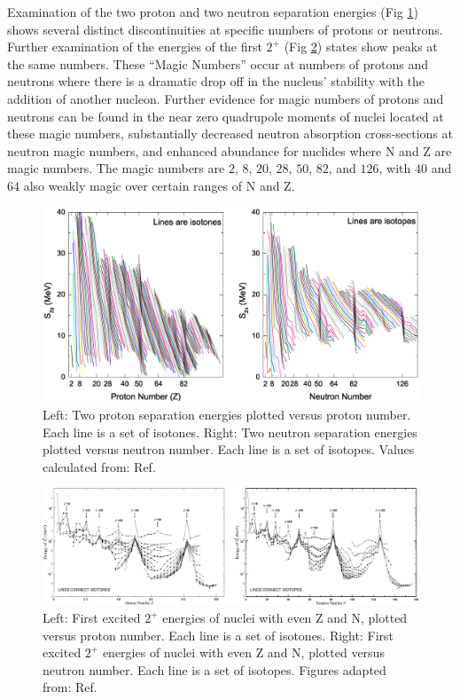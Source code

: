 Examination of the two proton and two neutron separation energies (Fig \ref{fig:chp2-masses}) shows several distinct discontinuities at specific numbers of protons or neutrons. Further examination of the energies of the first $2^+$ (Fig \ref{fig:chp2-two-plus-energies}) states show peaks at the same numbers. These ``Magic Numbers'' occur at numbers of protons and neutrons where there is a dramatic drop off in the nucleus' stability with the addition of another nucleon. Further evidence for magic numbers of protons and neutrons can be found in the near zero quadrupole moments of nuclei located at these magic numbers, substantially decreased neutron absorption cross-sections at neutron magic numbers, and enhanced abundance for nuclides where N and Z are magic numbers. The magic numbers are $2$, $8$, $20$, $28$, $50$, $82$, and $126$, with $40$ and $64$ also weakly magic over certain ranges of N and Z.

\begin{figure}[h!]
\centerline{\includegraphics[width=\textwidth]{./img/c2/2nuc_sep_en.eps}}
	\caption{Left: Two proton separation energies plotted versus proton number. Each line is a set of isotones. Right: Two neutron separation energies plotted versus neutron number. Each line is a set of isotopes. Values calculated from: Ref.\cite{AME20031,AME20032}\label{fig:chp2-masses}}
\end{figure}

\begin{figure}[h!]
\centerline{\includegraphics[width=\textwidth]{./img/c2/2_plus_en.eps}}
	\caption{Left: First excited $2^+$ energies of nuclei with even Z and N, plotted versus proton number. Each line is a set of isotones. Right: First excited $2^+$ energies of nuclei with even Z and N, plotted versus neutron number. Each line is a set of isotopes. Figures adapted from: Ref.\cite{RamanTwoPlus}\label{fig:chp2-two-plus-energies}}
\end{figure}

